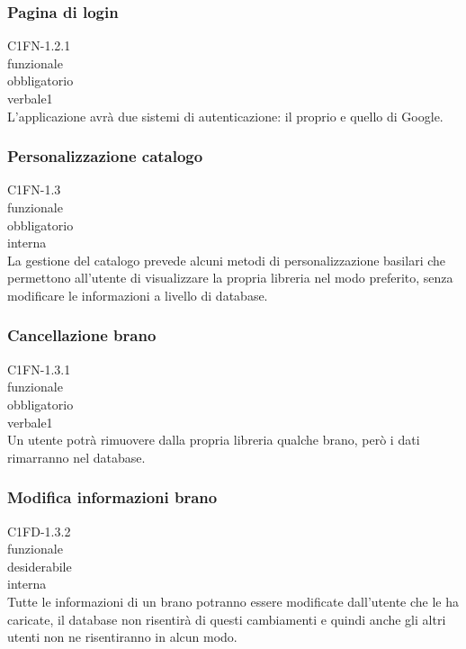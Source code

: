 \subsubsection*{Pagina di login}
 C1FN-1.2.1 \\
 funzionale \\
 obbligatorio \\
 verbale1 \\
L'applicazione avr\`a due sistemi di autenticazione: il proprio e quello di
Google.

\subsubsection*{Personalizzazione catalogo}
 C1FN-1.3 \\
 funzionale \\
 obbligatorio \\
 interna \\
La gestione del catalogo prevede alcuni metodi di personalizzazione basilari che
permettono all'utente di visualizzare la propria libreria nel modo preferito,
senza modificare le informazioni a livello di database.

\subsubsection*{Cancellazione brano}
 C1FN-1.3.1 \\
 funzionale \\
 obbligatorio \\
 verbale1 \\
Un utente potr\`a rimuovere dalla propria libreria qualche brano, per\`o i dati
rimarranno nel database.

\subsubsection*{Modifica informazioni brano}
 C1FD-1.3.2 \\
 funzionale \\
 desiderabile \\
 interna \\
Tutte le informazioni di un brano potranno essere modificate dall'utente che le
ha caricate, il database non risentir\`a di questi cambiamenti e quindi anche
gli altri utenti non ne risentiranno in alcun modo.


